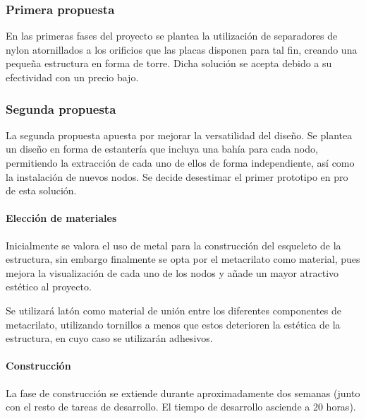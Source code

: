 \subsubsection{Primera propuesta}

En las primeras fases del proyecto se plantea la utilización de separadores de nylon atornillados a los orificios que las placas disponen para tal fin, creando una pequeña estructura en forma de torre. Dicha solución se acepta debido a su efectividad con un precio bajo.

\subsubsection{Segunda propuesta}

La segunda propuesta apuesta por mejorar la versatilidad del diseño. Se plantea un diseño en forma de estantería que incluya una bahía para cada nodo, permitiendo la extracción de cada uno de ellos de forma independiente, así como la instalación de nuevos nodos. Se decide desestimar el primer prototipo en pro de esta solución.

\paragraph{Elección de materiales}

Inicialmente se valora el uso de metal para la construcción del esqueleto de la estructura, sin embargo finalmente se opta por el metacrilato como material, pues mejora la visualización de cada uno de los nodos y añade un mayor atractivo estético al proyecto.

Se utilizará latón como material de unión entre los diferentes componentes de metacrilato, utilizando tornillos a menos que estos deterioren la estética de la estructura, en cuyo caso se utilizarán adhesivos.

\paragraph{Construcción}

La fase de construcción se extiende durante aproximadamente dos semanas (junto con el resto de tareas de desarrollo. El tiempo de desarrollo asciende a 20 horas).

